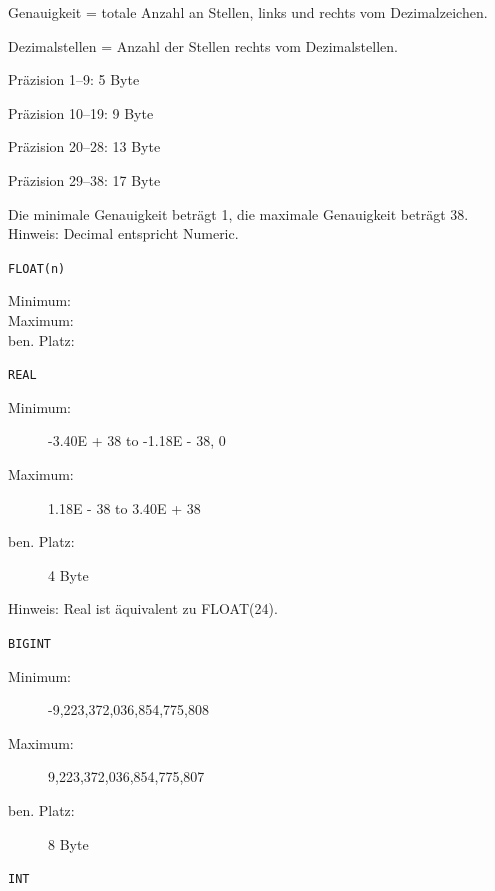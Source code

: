 \documentclass[12pt,ngerman,a4paper,index=totoc,twoside]{scrartcl}
\newcommand{\sql}[1]{\texttt{#1}}
\begin{document}
\begin{compactitem}
\begin{compactitem}
Genauigkeit = totale Anzahl an Stellen, links und rechts vom Dezimalzeichen. 

Dezimalstellen = Anzahl der Stellen rechts vom Dezimalstellen. 

\begin{compactitem}
 \item Präzision 1--9: 5 Byte
 \item Präzision 10--19: 9 Byte
 \item Präzision 20--28: 13 Byte
 \item Präzision 29--38: 17 Byte
\end{compactitem}

Die minimale Genauigkeit beträgt 1, die maximale Genauigkeit beträgt 38. Hinweis: Decimal entspricht Numeric. 

 \item \sql{FLOAT(n)}  
 
   \begin{description}
  	\item[Minimum:] 
  	\item[Maximum:] 
  	\item[ben. Platz:] 
  \end{description}	
  
 \item \sql{REAL}  
 
   \begin{description}
  	\item[Minimum:] -3.40E + 38 to -1.18E - 38, 0
  	\item[Maximum:] 1.18E - 38 to 3.40E + 38
  	\item[ben. Platz:] 4 Byte
  \end{description}	

Hinweis: Real ist äquivalent zu FLOAT(24). 
  
 \item \sql{BIGINT}  
 
   \begin{description}
  	\item[Minimum:] -9,223,372,036,854,775,808
  	\item[Maximum:] 9,223,372,036,854,775,807
  	\item[ben. Platz:] 8 Byte
  \end{description}	
  
 
 \item \sql{INT}  
 

\end{compactitem}
\end{compactitem}
\end{document}
